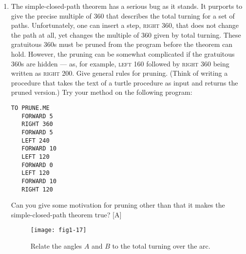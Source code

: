 \documentclass{book}
\begin{document}
\begin{enumerate}
\item The simple-closed-path theorem has a serious bug as it stands. It purports to give the precise multiple of 360 that describes the total turning
for a set of paths. Unfortunately, one can insert a step, \textsc{right 360},
that does not change the path at all, yet changes the multiple of 360
given by total turning. These gratuitous 360s must be pruned from
the program before the theorem can hold. However, the pruning can
be somewhat complicated if the gratuitous 360s are hidden --- as, for example, \textsc{left 160} followed by \textsc{right 360} being written as \textsc{right 200}.
Give general rules for pruning. (Think of writing a procedure that takes
the text of a turtle procedure as input and returns the pruned version.)
Try your method on the following program:

\begin{verbatim}
TO PRUNE.ME
   FORWARD 5
   RIGHT 360
   FORWARD 5
   LEFT 240
   FORWARD 10
   LEFT 120
   FORWARD 0
   LEFT 120
   FORWARD 10
   RIGHT 120
\end{verbatim}
Can you give some motivation for pruning other than that it makes the
simple-closed-path theorem true? [A]


\begin{figure}
\begin{center}
\texttt{[image: fig1-17]}
\caption{Relate the angles $A$ and $B$ to the total turning over the arc.}
\end{center}
\end{figure}



\end{enumerate}
\end{document}
